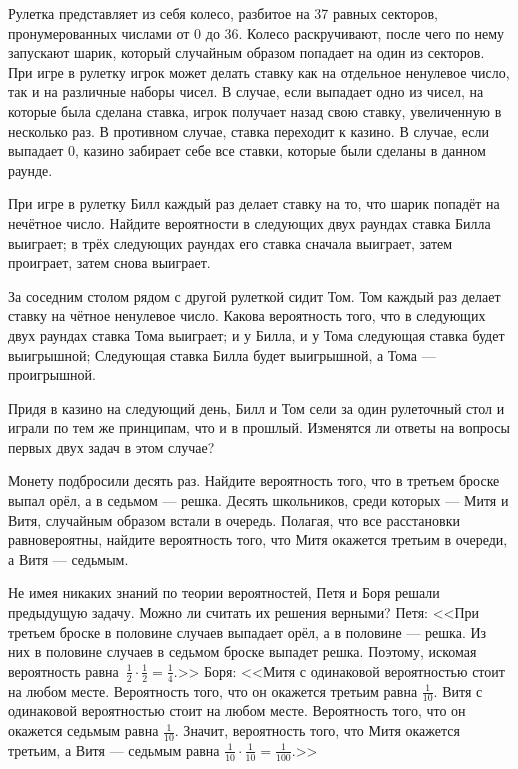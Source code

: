 \documentclass[a4paper,12pt]{article}
\begin{document}

Рулетка представляет из себя колесо, разбитое на 37 равных секторов, пронумерованных числами от 0 до 36. Колесо раскручивают, после чего по нему запускают шарик, который случайным образом попадает на один из секторов. При игре в рулетку игрок может делать ставку как на отдельное ненулевое число, так и на различные наборы чисел. В случае, если выпадает одно из чисел, на которые была сделана ставка, игрок получает назад свою ставку, увеличенную в несколько раз. В противном случае, ставка переходит к казино. В случае, если выпадает 0, казино забирает себе все ставки, которые были сделаны в данном раунде.

  При игре в рулетку Билл каждый раз делает ставку на то, что шарик попадёт на нечётное число. Найдите вероятности  в следующих двух раундах ставка Билла выиграет;  в трёх следующих раундах его ставка сначала выиграет, затем проиграет, затем снова выиграет.

  За соседним столом рядом с другой рулеткой сидит Том. Том каждый раз делает ставку на чётное ненулевое число. Какова вероятность того, что  в следующих двух раундах ставка Тома выиграет;  и у Билла, и у Тома следующая ставка будет выигрышной;  Следующая ставка Билла будет выигрышной, а Тома --- проигрышной.

  Придя в казино на следующий день, Билл и Том сели за один рулеточный стол и играли по тем же принципам, что и в прошлый. Изменятся ли ответы на вопросы первых двух задач в этом случае?

   Монету подбросили десять раз. Найдите вероятность того, что в третьем броске выпал орёл, а в седьмом --- решка.
   Десять школьников, среди которых --- Митя и Витя, случайным образом встали в очередь. Полагая, что все расстановки равновероятны, найдите вероятность того, что Митя окажется третьим в очереди, а Витя --- седьмым.

  Не имея никаких знаний по теории вероятностей, Петя и Боря решали предыдущую задачу. Можно ли считать их решения верными?
   Петя: <<При третьем броске в половине случаев выпадает орёл, а в половине --- решка. Из них в половине случаев в седьмом броске выпадет решка. Поэтому, искомая вероятность равна~$\frac{1}{2}\cdot\frac{1}{2}=\frac{1}{4}$.>>
   Боря: <<Митя с одинаковой вероятностью стоит на любом месте. Вероятность того, что он окажется третьим равна $\frac{1}{10}$. Витя с одинаковой вероятностью стоит на любом месте. Вероятность того, что он окажется седьмым равна $\frac{1}{10}$. Значит, вероятность того, что Митя окажется третьим, а Витя --- седьмым равна $\frac{1}{10}\cdot\frac{1}{10}=\frac{1}{100}$.>>
\end{document}
